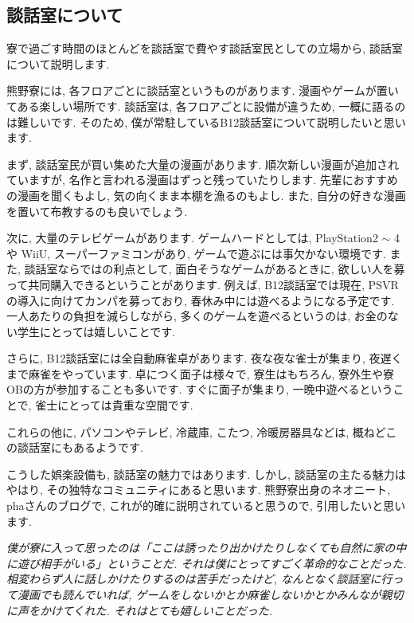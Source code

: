 \documentclass[10pt,b5jsbook,dvips,dvipdfmx,openany]{jsbook}
\theoremstyle{definition}
\begin{document}

		\subsection{談話室について}

		寮で過ごす時間のほとんどを談話室で費やす談話室民としての立場から, 談話室について説明します. 

		熊野寮には, 各フロアごとに談話室というものがあります. 漫画やゲームが置いてある楽しい場所です. 談話室は, 各フロアごとに設備が違うため, 一概に語るのは難しいです. そのため, 僕が常駐しているB12談話室について説明したいと思います. 

		まず, 談話室民が買い集めた大量の漫画があります. 順次新しい漫画が追加されていますが, 名作と言われる漫画はずっと残っていたりします. 先輩におすすめの漫画を聞くもよし, 気の向くまま本棚を漁るのもよし. また, 自分の好きな漫画を置いて布教するのも良いでしょう. 

		次に, 大量のテレビゲームがあります. ゲームハードとしては, PlayStation2 $ \sim $ 4や WiiU, スーパーファミコンがあり, ゲームで遊ぶには事欠かない環境です. また, 談話室ならではの利点として, 面白そうなゲームがあるときに, 欲しい人を募って共同購入できるということがあります. 例えば, B12談話室では現在, PSVRの導入に向けてカンパを募っており, 春休み中には遊べるようになる予定です. 一人あたりの負担を減らしながら, 多くのゲームを遊べるというのは, お金のない学生にとっては嬉しいことです. 

		さらに, B12談話室には全自動麻雀卓があります. 夜な夜な雀士が集まり, 夜遅くまで麻雀をやっています. 卓につく面子は様々で, 寮生はもちろん, 寮外生や寮OBの方が参加することも多いです. すぐに面子が集まり, 一晩中遊べるということで, 雀士にとっては貴重な空間です. 

		これらの他に, パソコンやテレビ, 冷蔵庫, こたつ, 冷暖房器具などは, 概ねどこの談話室にもあるようです. 

		こうした娯楽設備も, 談話室の魅力ではあります. しかし, 談話室の主たる魅力はやはり, その独特なコミュニティにあると思います. 熊野寮出身のネオニート, phaさんのブログで, これが的確に説明されていると思うので, 引用したいと思います. 

		\emph{僕が寮に入って思ったのは「ここは誘ったり出かけたりしなくても自然に家の中に遊び相手がいる」ということだ. それは僕にとってすごく革命的なことだった. 相変わらず人に話しかけたりするのは苦手だったけど, なんとなく談話室に行って漫画でも読んでいれば, ゲームをしないかとか麻雀しないかとかみんなが親切に声をかけてくれた. それはとても嬉しいことだった. }
\end{document}
